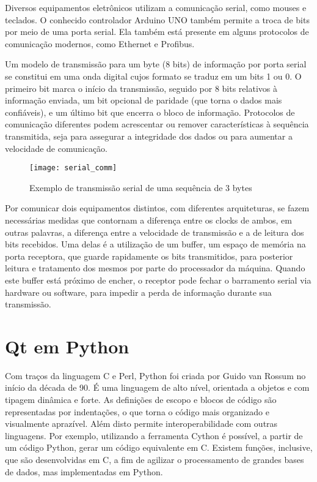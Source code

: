 Diversos equipamentos eletrônicos utilizam a comunicação serial, como mouses e teclados. O conhecido controlador Arduino UNO também permite a troca de bits por meio de uma porta serial. Ela também está presente em alguns protocolos de comunicação modernos, como Ethernet e Profibus.

Um modelo de transmissão para um byte (8 bits) de informação por porta serial se constitui em uma onda digital cujos formato se traduz em um bits 1 ou 0. O primeiro bit marca o início da transmissão, seguido por 8 bits relativos à informação enviada, um bit opcional de paridade (que torna o dados mais confiáveis), e um último bit que encerra o bloco de informação. Protocolos de comunicação diferentes podem acrescentar ou remover características à sequência transmitida, seja para assegurar a integridade dos dados ou para aumentar a velocidade de comunicação.

\begin{figure}[H]
	\centering
	\texttt{[image: serial\_comm]}
	\caption{Exemplo de transmissão serial de uma sequência de 3 bytes}
	\label{img_serial_comm}
\end{figure}

Por comunicar dois equipamentos distintos, com diferentes arquiteturas, se fazem necessárias medidas que contornam a diferença entre os clocks de ambos, em outras palavras, a diferença entre a velocidade de transmissão e a de leitura dos bits recebidos. Uma delas é a utilização de um buffer, um espaço de memória na porta receptora, que guarde rapidamente os bits transmitidos, para posterior leitura e tratamento dos mesmos por parte do processador da máquina. Quando este buffer está próximo de encher, o receptor pode fechar o barramento serial via hardware ou software, para impedir a perda de informação durante sua transmissão.

\section{Qt em Python}

Com traços da linguagem C e Perl, Python foi criada por Guido van Rossum no início da década de 90. É uma linguagem de alto nível, orientada a objetos e com tipagem dinâmica e forte. As definições de escopo e blocos de código são representadas por indentações, o que torna o código mais organizado e visualmente aprazível. Além disto permite interoperabilidade com outras linguagens. Por exemplo, utilizando a ferramenta Cython é possível, a partir de um código Python, gerar um código equivalente em C. Existem funções, inclusive, que são desenvolvidas em C, a fim de agilizar o processamento de grandes bases de dados, mas implementadas em Python.

